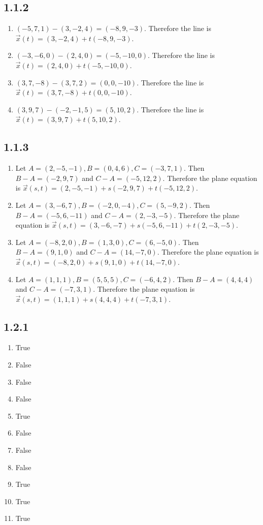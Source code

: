 \documentclass[12pt,titlepage]{extarticle}
\begin{document}
\subsection*{1.1.2}
\begin{enumerate}[label=\alph*)]
	\item $(-5, 7, 1) - (3, -2, 4) = (-8, 9, -3)$. Therefore the line is $\vec{x}(t) = (3, -2, 4) + t(-8, 9, -3)$.
	\item $(-3, -6,0) - (2,4,0) = (-5, -10, 0)$. Therefore the line is $\vec{x}(t) = (2,4,0) + t(-5,-10,0)$.
	\item $(3,7,-8)-(3,7,2) = (0, 0, -10)$. Therefore the line is $\vec{x}(t) = (3, 7, -8) + t(0, 0, -10)$.
	\item $(3,9,7)-(-2,-1,5) = (5,10,2)$. Therefore the line is $\vec{x}(t) = (3,9,7) + t(5,10,2)$.
\end{enumerate}

\subsection*{1.1.3}
\begin{enumerate}[label=\alph*)]
	\item Let $A = (2, -5, -1), B = (0,4,6), C = (-3,7,1)$. Then $B - A = (-2, 9, 7)$ and $C - A = (-5, 12, 2)$. Therefore the plane equation is $\vec{x}(s,t) = (2, -5, -1) + s(-2,9,7) + t(-5, 12, 2)$.
	\item Let $A = (3, -6, 7), B = (-2,0,-4), C = (5,-9,2)$. Then $B - A = (-5, 6, -11)$ and $C - A = (2, -3, -5)$. Therefore the plane equation is $\vec{x}(s,t) = (3, -6, -7) + s(-5, 6, -11) + t(2, -3, -5)$.
	\item Let $A = (-8, 2, 0), B = (1,3,0), C = (6,-5,0)$. Then $B - A = (9, 1, 0)$ and $C - A = (14, -7, 0)$. Therefore the plane equation is $\vec{x}(s,t) = (-8, 2, 0) + s(9, 1, 0) + t(14, -7, 0)$.
	\item Let $A = (1,1,1), B = (5,5,5), C = (-6,4,2)$. Then $B - A = (4,4,4)$ and $C - A = (-7, 3, 1)$. Therefore the plane equation is $\vec{x}(s,t) = (1,1,1) + s(4,4,4) + t(-7,3,1)$.
\end{enumerate}

\subsection*{1.2.1}
\begin{multicols}{3}
	\begin{enumerate}[label=\alph*)]
		\item True
		\item False
		\item False
		\item False
		\item True
		\item False
		\item False
		\item False
		\item True
		\item True
		\item True
	\end{enumerate}
\end{multicols}
\end{document}
